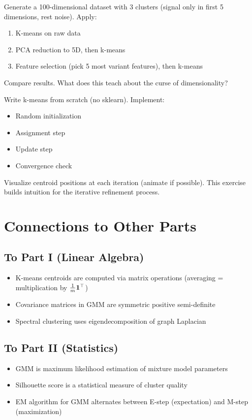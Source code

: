 \begin{exercise}
Generate a 100-dimensional dataset with 3 clusters (signal only in first 5 dimensions, rest noise). Apply:
\begin{enumerate}
    \item K-means on raw data
    \item PCA reduction to 5D, then k-means
    \item Feature selection (pick 5 most variant features), then k-means
\end{enumerate}
Compare results. What does this teach about the curse of dimensionality?
\end{exercise}

\begin{exercise}
Write k-means from scratch (no sklearn). Implement:
\begin{itemize}
    \item Random initialization
    \item Assignment step
    \item Update step
    \item Convergence check
\end{itemize}
Visualize centroid positions at each iteration (animate if possible). This exercise builds intuition for the iterative refinement process.
\end{exercise}

\section{Connections to Other Parts}

\subsection{To Part I (Linear Algebra)}
\begin{itemize}
    \item K-means centroids are computed via matrix operations (averaging = multiplication by $\frac{1}{m}\bm{1}^\top$)
    \item Covariance matrices in GMM are symmetric positive semi-definite
    \item Spectral clustering uses eigendecomposition of graph Laplacian
\end{itemize}

\subsection{To Part II (Statistics)}
\begin{itemize}
    \item GMM is maximum likelihood estimation of mixture model parameters
    \item Silhouette score is a statistical measure of cluster quality
    \item EM algorithm for GMM alternates between E-step (expectation) and M-step (maximization)
\end{itemize}

